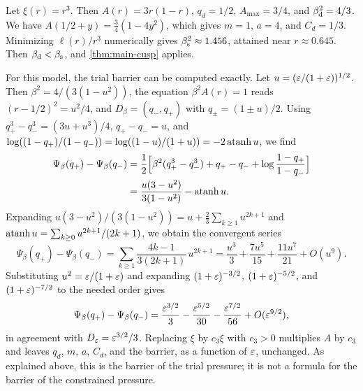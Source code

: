 \begin{example}\label{ex:inf-cubic}
Let $\xi(r)=r^3$. Then $A(r)=3r(1-r)$, $q_d=1/2$, $A_{\max}=3/4$, and $\beta_{\mathrm d}^2=4/3$. We have $A(1/2+y)=\frac34(1-4y^2)$, which gives $m=1$, $a=4$, and $C_d=1/3$. Minimizing $\ell(r)/r^3$ numerically gives $\beta_{\mathrm s}^2\approx1.456$, attained near $r\approx0.645$. Then $\beta_{\mathrm d}<\beta_{\mathrm s}$, and \cref{thm:main-cusp} applies.

For this model, the trial barrier can be computed exactly. Let $u=(\varepsilon/(1+\varepsilon))^{1/2}$. Then $\beta^2=4/(3(1-u^2))$, the equation $\beta^2A(r)=1$ reads $(r-1/2)^2=u^2/4$, and $D_\beta=(q_-,q_+)$ with $q_\pm=(1\pm u)/2$. Using $q_+^3-q_-^3=(3u+u^3)/4$, $q_+-q_-=u$, and $\log((1-q_+)/(1-q_-))=\log((1-u)/(1+u))=-2\operatorname{atanh} u$, we find
\begin{equation*}
\begin{split}
\Psi_\beta(q_+)-\Psi_\beta(q_-)&=\frac12\Bigl[\beta^2(q_+^3-q_-^3)+q_+-q_-+\log\frac{1-q_+}{1-q_-}\Bigr]\\
&=\frac{u(3-u^2)}{3(1-u^2)}-\operatorname{atanh} u.
\end{split}
\end{equation*}
Expanding $u(3-u^2)/(3(1-u^2))=u+\frac23\sum_{k\ge1}u^{2k+1}$ and $\operatorname{atanh} u=\sum_{k\ge0}u^{2k+1}/(2k+1)$, we obtain the convergent series
\begin{equation*}
\Psi_\beta(q_+)-\Psi_\beta(q_-)=\sum_{k\ge1}\frac{4k-1}{3(2k+1)}\,u^{2k+1}=\frac{u^3}3+\frac{7u^5}{15}+\frac{11u^7}{21}+O(u^9).
\end{equation*}
Substituting $u^2=\varepsilon/(1+\varepsilon)$ and expanding $(1+\varepsilon)^{-3/2}$, $(1+\varepsilon)^{-5/2}$, and $(1+\varepsilon)^{-7/2}$ to the needed order gives
\begin{equation*}
\Psi_\beta(q_+)-\Psi_\beta(q_-)=\frac{\varepsilon^{3/2}}3-\frac{\varepsilon^{5/2}}{30}-\frac{\varepsilon^{7/2}}{56}+O(\varepsilon^{9/2}),
\end{equation*}
in agreement with $D_\varepsilon=\varepsilon^{3/2}/3$. Replacing $\xi$ by $c_3\xi$ with $c_3>0$ multiplies $A$ by $c_3$ and leaves $q_d$, $m$, $a$, $C_d$, and the barrier, as a function of $\varepsilon$, unchanged. As explained above, this is the barrier of the trial pressure; it is not a formula for the barrier of the constrained pressure.
\end{example}


